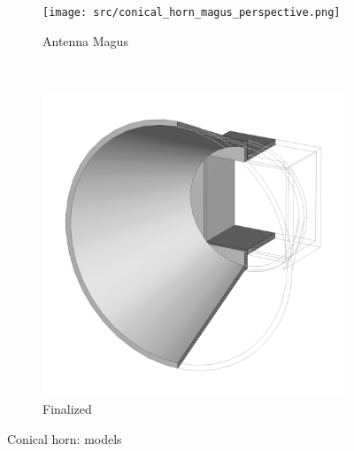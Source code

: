 \documentclass[11pt,a4paper,twoside,openany]{report}
\begin{document}
\begin{figure}[!ht]
    \centering
    \begin{subfigure}{.45\textwidth}
        \centering
        \texttt{[image: src/conical\_horn\_magus\_perspective.png]}
        \caption{\label{fig:conical-horn-magus-perspective}Antenna Magus}
    \end{subfigure}
    ~
    \begin{subfigure}{.45\textwidth}
        \centering
        \includegraphics[width=\textwidth]{src/conical_horn_perspective.png}
        \caption{\label{fig:conical-horn-perspective}Finalized}
    \end{subfigure}
    \caption{\label{fig:conical-horn-models}Conical horn: models}
\end{figure}
\end{document}
